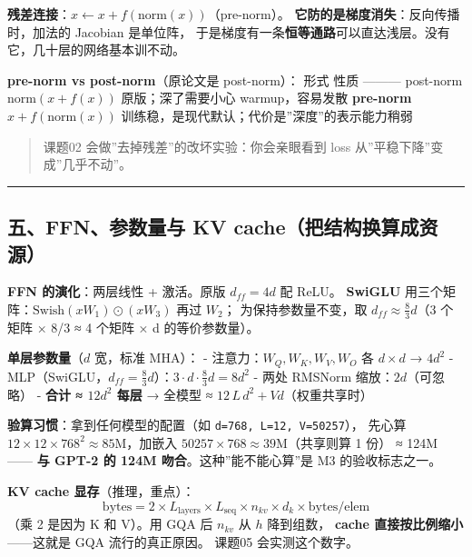 \documentclass[
  chinese,
  11pt,
]{ctexart}
\begin{document}
\textbf{残差连接}：\(x \leftarrow x + f(\mathrm{norm}(x))\)（pre-norm）。 \textbf{它防的是梯度消失}：反向传播时，加法的 Jacobian 是单位阵， 于是梯度有一条\textbf{恒等通路}可以直达浅层。没有它，几十层的网络基本训不动。

\textbf{pre-norm vs post-norm}（原论文是 post-norm）： \textbar{} \textbar{} 形式 \textbar{} 性质 \textbar{} \textbar---\textbar---\textbar---\textbar{} \textbar{} post-norm \textbar{} \(\mathrm{norm}(x + f(x))\) \textbar{} 原版；深了需要小心 warmup，容易发散 \textbar{} \textbar{} \textbf{pre-norm} \textbar{} \(x + f(\mathrm{norm}(x))\) \textbar{} 训练稳，是现代默认；代价是''深度''的表示能力稍弱 \textbar{}

\begin{quote}
课题02 会做''去掉残差''的改坏实验：你会亲眼看到 loss 从''平稳下降''变成''几乎不动''。
\end{quote}

\begin{center}\rule{0.5\linewidth}{0.5pt}\end{center}

\subsection{\texorpdfstring{五、FFN、参数量与 KV cache（\textbf{把结构换算成资源}）}{五、FFN、参数量与 KV cache（把结构换算成资源）}}\label{ux4e94ffnux53c2ux6570ux91cfux4e0e-kv-cacheux628aux7ed3ux6784ux6362ux7b97ux6210ux8d44ux6e90}

\textbf{FFN 的演化}：两层线性 + 激活。原版 \(d_{ff} = 4d\) 配 ReLU。 \textbf{SwiGLU} 用三个矩阵：\(\mathrm{Swish}(xW_1)\odot(xW_3)\) 再过 \(W_2\)； 为保持参数量不变，取 \(d_{ff} \approx \tfrac{8}{3}d\)（3 个矩阵 × 8/3 ≈ 4 个矩阵 × d 的等价参数量）。

\textbf{单层参数量}（\(d\) 宽，标准 MHA）： - 注意力：\(W_Q,W_K,W_V,W_O\) 各 \(d\times d\) → \(4d^2\) - MLP（SwiGLU，\(d_{ff}=\tfrac{8}{3}d\)）：\(3\cdot d\cdot \tfrac{8}{3}d = 8d^2\) - 两处 RMSNorm 缩放：\(2d\)（可忽略） - \textbf{合计 ≈ \(12d^2\) 每层} → 全模型 ≈ \(12\,L\,d^2 + Vd\)（权重共享时）

\textbf{验算习惯}：拿到任何模型的配置（如 \texttt{d=768,\ L=12,\ V=50257}）， 先心算 \(12\times12\times768^2 \approx 85\text{M}\)，加嵌入 \(50257\times768\approx39\text{M}\)（共享则算 1 份） ≈ 124M ------ \textbf{与 GPT-2 的 124M 吻合}。这种''能不能心算''是 M3 的验收标志之一。

\textbf{KV cache 显存}（推理，重点）： \[\text{bytes} = 2 \times L_{\text{layers}} \times L_{\text{seq}} \times n_{kv} \times d_k \times \text{bytes/elem}\] （乘 2 是因为 K 和 V）。用 GQA 后 \(n_{kv}\) 从 \(h\) 降到组数， \textbf{cache 直接按比例缩小}------这就是 GQA 流行的真正原因。 课题05 会实测这个数字。
\end{document}

